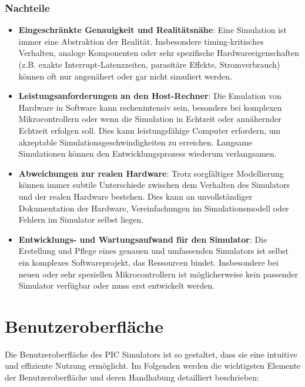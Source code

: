 \subsection*{Nachteile}
\begin{itemize}
    \item \textbf{Eingeschränkte Genauigkeit und Realitätsnähe}: Eine Simulation ist immer eine Abstraktion der Realität. Insbesondere timing-kritisches Verhalten, analoge Komponenten oder sehr spezifische Hardwareeigenschaften (z.B. exakte Interrupt-Latenzzeiten, parasitäre Effekte, Stromverbrauch) können oft nur angenähert oder gar nicht simuliert werden. 
    \item \textbf{Leistungsanforderungen an den Host-Rechner}: Die Emulation von Hardware in Software kann rechenintensiv sein, besonders bei komplexen Mikrocontrollern oder wenn die Simulation in Echtzeit oder annähernder Echtzeit erfolgen soll. Dies kann leistungsfähige Computer erfordern, um akzeptable Simulationsgeschwindigkeiten zu erreichen. Langsame Simulationen können den Entwicklungsprozess wiederum verlangsamen.
    \item \textbf{Abweichungen zur realen Hardware}: Trotz sorgfältiger Modellierung können immer subtile Unterschiede zwischen dem Verhalten des Simulators und der realen Hardware bestehen. Dies kann an unvollständiger Dokumentation der Hardware, Vereinfachungen im Simulationsmodell oder Fehlern im Simulator selbst liegen. 
    \item \textbf{Entwicklungs- und Wartungsaufwand für den Simulator}: Die Erstellung und Pflege eines genauen und umfassenden Simulators ist selbst ein komplexes Softwareprojekt, das Ressourcen bindet. Insbesondere bei neuen oder sehr speziellen Mikrocontrollern ist möglicherweise kein passender Simulator verfügbar oder muss erst entwickelt werden.
\end{itemize}
 
\chapter{Benutzeroberfläche}

Die Benutzeroberfläche des PIC Simulators ist so gestaltet, dass sie eine intuitive und effiziente Nutzung ermöglicht. Im Folgenden werden die wichtigsten Elemente der Benutzeroberfläche und deren Handhabung detailliert beschrieben:

